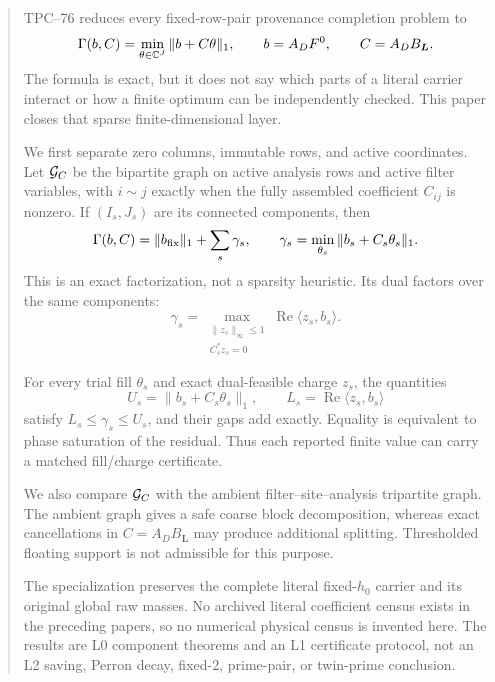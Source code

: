 \begin{abstract}
TPC--76 reduces every fixed-row-pair provenance completion problem to
\[
 \Gamma(b,C)
 =
 \min_{\theta\in\C^J}\|b+C\theta\|_1,
 \qquad
 b=A_DF^0,\qquad
 C=A_DB_{\boldsymbol L}.
\]
The formula is exact, but it does not say which parts of a literal
carrier interact or how a finite optimum can be independently checked.
This paper closes that sparse finite-dimensional layer.

We first separate zero columns, immutable rows, and active coordinates.
Let \(\cG_C\) be the bipartite graph on active analysis rows and active
filter variables, with \(i\sim j\) exactly when the fully assembled
coefficient \(C_{ij}\) is nonzero. If
\((I_s,J_s)\) are its connected components, then
\[
 \Gamma(b,C)
 =
 \|b_{\rm fix}\|_1
 +
 \sum_s
 \gamma_s,\qquad
 \gamma_s
 =
 \min_{\theta_s}\|b_s+C_s\theta_s\|_1.
\]
This is an exact factorization, not a sparsity heuristic. Its dual
factors over the same components:
\[
 \gamma_s
 =
 \max_{\substack{\|z_s\|_\infty\le1\\C_s^*z_s=0}}
 \operatorname{Re}\langle z_s,b_s\rangle .
\]

For every trial fill \(\theta_s\) and exact dual-feasible charge \(z_s\),
the quantities
\[
 U_s=\|b_s+C_s\theta_s\|_1,\qquad
 L_s=\operatorname{Re}\langle z_s,b_s\rangle
\]
satisfy \(L_s\le\gamma_s\le U_s\), and their gaps add exactly. Equality
is equivalent to phase saturation of the residual. Thus each reported
finite value can carry a matched fill/charge certificate.

We also compare \(\cG_C\) with the ambient
filter--site--analysis tripartite graph. The ambient graph gives a safe
coarse block decomposition, whereas exact cancellations in
\(C=A_DB_{\boldsymbol L}\) may produce additional splitting. Thresholded
floating support is not admissible for this purpose.

The specialization preserves the complete literal fixed-\(h_0\)
carrier and its original global raw masses. No archived literal
coefficient census exists in the preceding papers, so no numerical
physical census is invented here. The results are L0 component theorems
and an L1 certificate protocol, not an L2 saving, Perron decay,
fixed-\(2\), prime-pair, or twin-prime conclusion.
\end{abstract}
